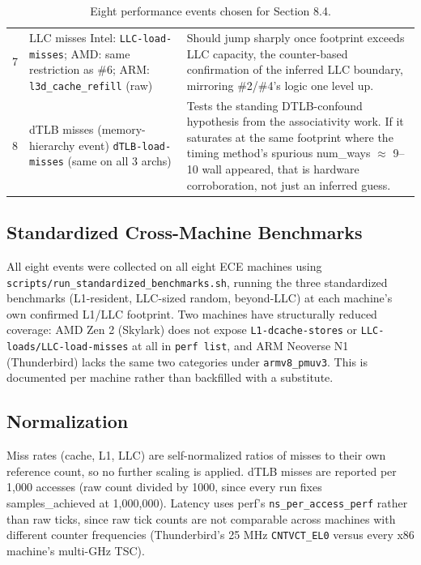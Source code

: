 \documentclass{article}
\begin{document}
\begin{table}[htbp]
\begin{tabular}{@{} c p{4.3cm} p{9cm} @{}}
7 & LLC misses \newline Intel: \texttt{LLC-load-misses}; AMD: same restriction as \#6; ARM: \texttt{l3d\_cache\_refill} (raw) &
Should jump sharply once footprint exceeds LLC capacity, the counter-based confirmation of the inferred LLC boundary, mirroring \#2/\#4's logic one level up. \\

8 & dTLB misses (memory-hierarchy event) \newline \texttt{dTLB-load-misses} (same on all 3 archs) &
Tests the standing DTLB-confound hypothesis from the associativity work. If it saturates at the same footprint where the timing method's spurious num\_ways $\approx$ 9--10 wall appeared, that is hardware corroboration, not just an inferred guess. \\

\bottomrule
\end{tabular}
\caption{Eight performance events chosen for Section 8.4.}
\label{tab:8_4_events}
\end{table}

\subsection{Standardized Cross-Machine Benchmarks}
All eight events were collected on all eight ECE machines using \texttt{scripts/run\_standardized\_benchmarks.sh}, running the three standardized benchmarks (L1-resident, LLC-sized random, beyond-LLC) at each machine's own confirmed L1/LLC footprint. Two machines have structurally reduced coverage: AMD Zen 2 (Skylark) does not expose \texttt{L1-dcache-stores} or \texttt{LLC-loads/LLC-load-misses} at all in \texttt{perf list}, and ARM Neoverse N1 (Thunderbird) lacks the same two categories under \texttt{armv8\_pmuv3}. This is documented per machine rather than backfilled with a substitute.

\subsection{Normalization}
Miss rates (cache, L1, LLC) are self-normalized ratios of misses to their own reference count, so no further scaling is applied. dTLB misses are reported per 1{,}000 accesses (raw count divided by 1000, since every run fixes samples\_achieved at 1{,}000{,}000). Latency uses perf's \texttt{ns\_per\_access\_perf} rather than raw ticks, since raw tick counts are not comparable across machines with different counter frequencies (Thunderbird's 25 MHz \texttt{CNTVCT\_EL0} versus every x86 machine's multi-GHz TSC).
\end{document}
